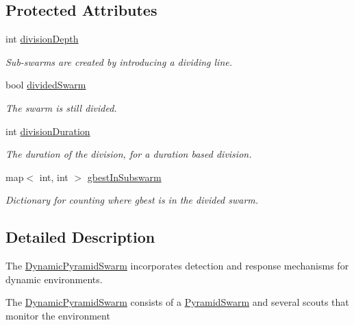 \subsection*{Protected Attributes}
\begin{CompactItemize}
\item 
int \hyperlink{classDynamicPyramidSwarm_1693ca6aad7a16e24a0554c1dfa4e285}{divisionDepth}
\begin{CompactList}\small\item\em Sub-swarms are created by introducing a dividing line. \item\end{CompactList}\item 
bool \hyperlink{classDynamicPyramidSwarm_cddb5d45ca6e266ac8b248aee744b9d9}{dividedSwarm}
\begin{CompactList}\small\item\em The swarm is still divided. \item\end{CompactList}\item 
int \hyperlink{classDynamicPyramidSwarm_3d2fa3e702d824e412c07673b54a87fa}{divisionDuration}
\begin{CompactList}\small\item\em The duration of the division, for a duration based division. \item\end{CompactList}\item 
map$<$ int, int $>$ \hyperlink{classDynamicPyramidSwarm_6251f69cae0650411648ce8d6de1bc2d}{gbestInSubswarm}
\begin{CompactList}\small\item\em Dictionary for counting where gbest is in the divided swarm. \item\end{CompactList}\end{CompactItemize}


\subsection{Detailed Description}
The \hyperlink{classDynamicPyramidSwarm}{DynamicPyramidSwarm} incorporates detection and response mechanisms for dynamic environments. 

The \hyperlink{classDynamicPyramidSwarm}{DynamicPyramidSwarm} consists of a \hyperlink{classPyramidSwarm}{PyramidSwarm} and several scouts that monitor the environment 


